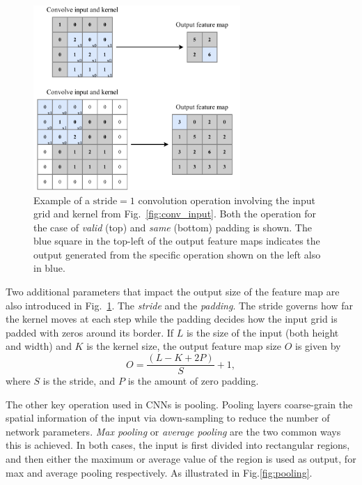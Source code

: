 \begin{figure} %
    \includegraphics[width=0.7\textwidth]{diagrams/6-cvn/conv_operation.pdf}
    \caption[Example of convolutional operation.]
    {Example of a $\mathrm{stride}=1$ convolution operation involving the input grid and kernel
        from Fig.~\ref{fig:conv_input}. Both the operation for the case of \emph{valid} (top) and
        \emph{same} (bottom) padding is shown. The blue square in the top-left of the output
        feature maps indicates the output generated from the specific operation shown on the left
        also in blue.}
    \label{fig:conv_operation}
\end{figure}

Two additional parameters that impact the output size of the feature map are also introduced in
Fig.~\ref{fig:conv_operation}. The \emph{stride} and the \emph{padding}. The stride governs how
far the kernel moves at each step while the padding decides how the input grid is padded with
zeros around its border. If $L$ is the size of the input (both height and width) and $K$ is the
kernel size, the output feature map size $O$ is given by
\begin{equation}
    O=\frac{(L-K+2P)}{S}+1,
    \label{eq:conv_size}
\end{equation}
where $S$ is the stride, and $P$ is the amount of zero padding.

The other key operation used in CNNs is pooling. Pooling layers coarse-grain the spatial
information of the input via down-sampling to reduce the number of network parameters. \emph{Max
    pooling} or \emph{average pooling} are the two common ways this is achieved. In both cases, the
input is first divided into rectangular regions, and then either the maximum or average value of
the region is used as output, for max and average pooling respectively. As illustrated in
Fig.\ref{fig:pooling}.

